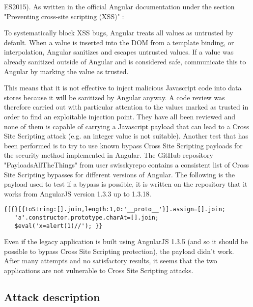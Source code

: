 ES2015). As written in the official Angular documentation under the section "Preventing cross-site scripting (XSS)" \cite{angular}:
\begin{quoting}[font=itshape, begintext={"}, endtext={"}]
To systematically block XSS bugs, Angular treats all values as untrusted by default. When a value is inserted into the DOM from a template binding, or interpolation, Angular sanitizes and escapes untrusted values. If a value was already sanitized outside of Angular and is considered safe, communicate this to Angular by marking the value as trusted.
\end{quoting}
This means that it is not effective to inject malicious Javascript code into data stores because it will be sanitized by Angular anyway. A code review was therefore carried out with particular attention to the values marked as trusted in order to find an exploitable injection point. They have all been reviewed and none of them is capable of carrying a Javascript payload that can lead to a Cross Site Scripting attack (e.g. an integer value is not suitable). Another test that has been performed is to try to use known bypass Cross Site Scripting payloads for the security method implemented in Angular. The GitHub repository "PayloadsAllTheThings" from user swisskyrepo contains a consistent list of Cross Site Scripting bypasses for different versions of Angular. The following is the payload used to test if a bypass is possible, it is written on the repository that it works from AngularJS version 1.3.3 up to 1.3.18.
\begin{lstlisting}
{{{}[{toString:[].join,length:1,0:'__proto__'}].assign=[].join;
   'a'.constructor.prototype.charAt=[].join;
   $eval('x=alert(1)//'); }}
\end{lstlisting}
Even if the legacy application is built using AngularJS 1.3.5 (and so it should be possible to bypass Cross Site Scripting protection), the payload didn't work. After many attempts and no satisfactory results, it seems that the two applications are not vulnerable to Cross Site Scripting attacks.


\subsection{Attack description}

